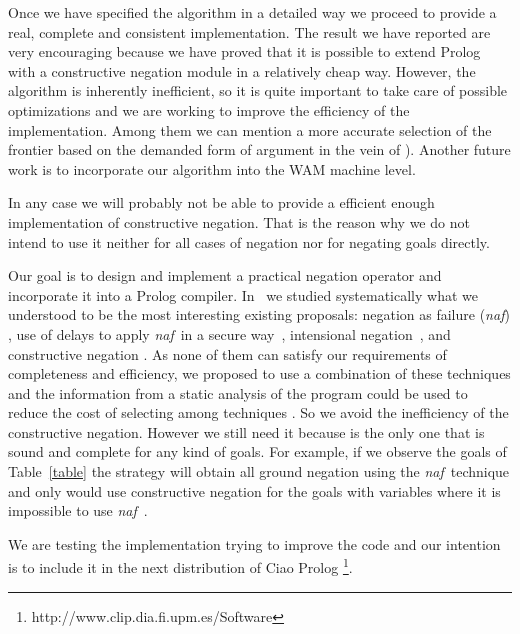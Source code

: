 \documentclass{llncs}
\newcommand{\naf}{{\em naf}}\newcommand{\viejo}[1]{}
\begin{document}
Once we have specified the algorithm in a detailed way we proceed to provide
a real, complete and consistent implementation. The result we have reported are
very encouraging because we have proved that it is possible to extend
Prolog with a constructive negation module in a relatively cheap way.
However, the algorithm is inherently inefficient, so it is quite 
important to take care of possible optimizations and we are working 
to improve the efficiency of the implementation. Among them we can mention
a more accurate selection of the frontier based on the demanded form
of argument in the vein of \cite{Moreno2}). Another future work is
to incorporate our algorithm into the WAM machine level.

In any case we will probably not be able to provide a efficient enough implementation
of constructive negation. That is
the reason why we do not intend to use it neither for all cases of
negation nor for negating goals directly.

Our goal is to design and implement a practical negation operator and
incorporate it into a Prolog compiler.
In~\cite{SusanaPADL2000,SusanaLPAR01} we studied systematically what
we understood to be the most interesting existing proposals: negation
as failure (\naf) \cite{Clark}, use of delays to apply \naf\ in a
secure way~\cite{naish:lncs}, intensional
negation~\cite{Barbuti1,Barbuti2}, and constructive negation
\cite{Chan1,Chan2,Drabent,Stuckey,Stuckey95}. As none of them can
satisfy our requirements of completeness and efficiency, we proposed
to use a combination of these techniques and the information from a
static analysis of the program could be used to reduce the cost of
selecting among techniques \cite{SusanaLPAR01}. So we avoid the
inefficiency of the constructive negation. However we still need it because
is the only one that is sound and complete for
any kind of goals. For example, if we observe the goals of
Table~\ref{table} the strategy will obtain all ground negation using
the \naf\ technique and only would use constructive negation for the
goals with variables where it is impossible to use \naf\ . 

We are testing the implementation trying to improve the code and our
intention is to include it in the next distribution of Ciao Prolog
\footnote{http://www.clip.dia.fi.upm.es/Software}.
  


 \begin{small}

     
    

 \end{small}


\end{document}
